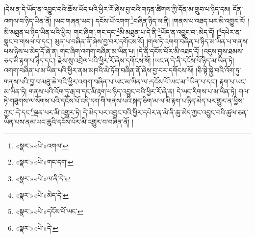 །དེས་ན་དེ་ཡོད་ན་འབྱུང་བའི་ཆོས་ཡོད་པའི་ཕྱིར་རོ་ཞེས་བྱ་བའི་གཏན་ཚིགས་ཀྱི་དོན་མ་གྲུབ་པ་ཉིད་དམ། དོན་འགལ་བ་ཉིད་ཡིན་ནོ། །ཡང་གཞན་ཡང་། དངོས་པོ་འགག་\footnote{«སྣར་»«པེ་»འགལ་}བཞིན་ཉིད་ལ་ནི། །གནས་པ་འཐད་པར་མི་འགྱུར་རོ། །མི་མཐུན་པ་ཉིད་ཡིན་པའི་ཕྱིར། གང་ཞིག་:གང་དང་\footnote{«སྣར་»«པེ་»གང་དག་}མི་མཐུན་པ་དེ་ནི་\footnote{«སྣར་»«པེ་»ལ་ནི་དེ་}ཡོད་ན་འབྱུང་བ་:མེད་དོ། །\footnote{«སྣར་»«པེ་»མེད་དེ་}དཔེར་ན་སྣང་བ་གསལ་བ་དང་། མུན་པ་བཞིན་ནོ་ཞེས་བྱ་བར་དགོངས་སོ། །གལ་ཏེ་འགག་བཞིན་པ་ཉིད་མ་ཡིན་པ་གནས་པས་ཉེས་པ་མེད་དོ་ཞེ་ན། གང་ཞིག་འགག་བཞིན་མ་ཡིན་པ། །དེ་ནི་དངོས་པོར་མི་འཐད་དོ། །འདུས་བྱས་ཐམས་ཅད་མི་རྟག་པ་ཉིད་དང་། རྗེས་སུ་འབྲེལ་པའི་ཕྱིར་རོ་ཞེས་དགོངས་སོ། །ཡང་ན་དེ་ནི་དངོས་པོ་ཉིད་མ་ཡིན་ཏེ། འགག་བཞིན་པ་མ་ཡིན་པའི་ཕྱིར་ནམ་མཁའི་མེ་ཏོག་བཞིན་ནོ་ཞེས་བྱ་བར་དགོངས་སོ། །ཅི་སྟེ་སྐྱེ་བའི་འོག་ཏུ་གནས་པའི་བྱ་བ་མཐུ་ཆེ་བའི་ཕྱིར་འགག་བཞིན་པ་ཡང་མ་ཡིན་ལ་:དངོས་པོ་ཡང་མ་\footnote{«སྣར་»«པེ་»དངོས་པོ་ཡང་}ཡིན་པ་དང་། རྟག་པ་ཡང་མ་ཡིན་ཏེ། གནས་པའི་འོག་ཏུ་རྒ་བ་དང་མི་རྟག་པ་ཉིད་འབྱུང་བའི་ཕྱིར་རོ་ཞེ་ན། དེ་ཡང་རིགས་པ་མ་ཡིན་ཏེ། གལ་ཏེ་གཟུགས་ལ་སོགས་པའི་དངོས་པོ་འདི་དག་གི་གནས་པའི་སྐད་ཅིག་མ་ལ་མི་རྟག་པ་ཉིད་མེད་པར་གྱུར་ན་ཕྱིས་ཀྱང་:དེ་དང་\footnote{«སྣར་»«པེ་»དེ་}ལྡན་པར་མི་འགྱུར་ཏེ། དེ་མེད་པར་འབྱུང་བའི་ཕྱིར་དཔེར་ན་མེ་ནི་ཆུ་མེད་ཀྱང་འབྱུང་བའི་ཚུལ་ཅན་ཡིན་པས་ནམ་ཡང་ཆུའི་དངོས་པོར་མི་འགྱུར་བ་བཞིན་ནོ། །
